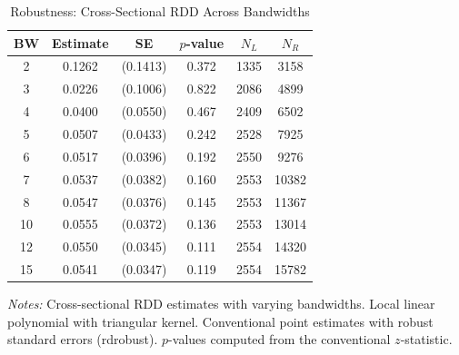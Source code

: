 \begin{table}[htbp]
\centering
\caption{Robustness: Cross-Sectional RDD Across Bandwidths}
\label{tab:robustness}
\begin{tabular}{cccccc}
\toprule
  BW & Estimate & SE & $p$-value & $N_L$ & $N_R$ \\
\midrule
  2 & 0.1262 & (0.1413) & 0.372 & 1335 & 3158 \\
  3 & 0.0226 & (0.1006) & 0.822 & 2086 & 4899 \\
  4 & 0.0400 & (0.0550) & 0.467 & 2409 & 6502 \\
  5 & 0.0507 & (0.0433) & 0.242 & 2528 & 7925 \\
  6 & 0.0517 & (0.0396) & 0.192 & 2550 & 9276 \\
  7 & 0.0537 & (0.0382) & 0.160 & 2553 & 10382 \\
  8 & 0.0547 & (0.0376) & 0.145 & 2553 & 11367 \\
  10 & 0.0555 & (0.0372) & 0.136 & 2553 & 13014 \\
  12 & 0.0550 & (0.0345) & 0.111 & 2554 & 14320 \\
  15 & 0.0541 & (0.0347) & 0.119 & 2554 & 15782 \\
\bottomrule
\end{tabular}
\begin{tablenotes}[flushleft]
\small
\item \textit{Notes:} Cross-sectional RDD estimates with varying bandwidths. Local linear polynomial with triangular kernel. Conventional point estimates with robust standard errors (rdrobust). $p$-values computed from the conventional $z$-statistic.
\end{tablenotes}
\end{table}
